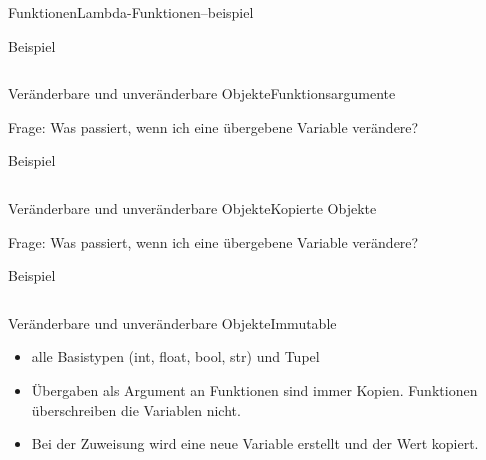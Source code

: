 \documentclass[xelatex,aspectratio=169]{beamer}
\begin{document}
\begin{frame}{Funktionen}{Lambda-Funktionen--beispiel}
    \begin{exampleblock}{Beispiel}
        \inputminted{python}{src/functions_lambda_example.py}
    \end{exampleblock}
\end{frame}

\begin{frame}[t]{Veränderbare und unveränderbare Objekte}{Funktionsargumente}
    \begin{alertblock}{Frage:}
        Was passiert, wenn ich eine übergebene Variable verändere?
    \end{alertblock}

    \begin{exampleblock}{Beispiel}
        \inputminted{python}{src/functions_mutable_example.py}
    \end{exampleblock}

\end{frame}


\begin{frame}[t]{Veränderbare und unveränderbare Objekte}{Kopierte Objekte}
    \begin{alertblock}{Frage:}
        Was passiert, wenn ich eine übergebene Variable verändere?
    \end{alertblock}

    \begin{exampleblock}{Beispiel}
        \inputminted{python}{src/functions_copy_example.py}
    \end{exampleblock}

\end{frame}

\begin{frame}{Veränderbare und unveränderbare Objekte}{Immutable}
    \begin{itemize}
        \item alle Basistypen (int, float, bool, str) und Tupel
        \item Übergaben als Argument an Funktionen sind immer Kopien. Funktionen überschreiben die Variablen nicht.
        \item Bei der Zuweisung wird eine neue Variable erstellt und der Wert kopiert.
    \end{itemize}

\end{frame}
\end{document}
